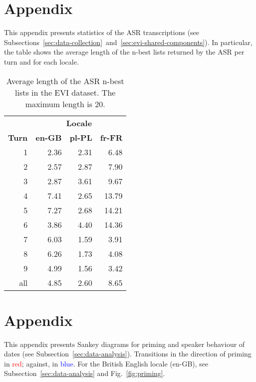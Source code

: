 \documentclass[11pt]{article}
\begin{document}
{\section{Appendix}
\label{appendix-asr}

{
This appendix presents statistics of the ASR transcriptions
(see Subsections~\ref{sec:data-collection}~and~\ref{sec:evi-shared-components}).
In particular, the table shows the average length of the n-best lists
returned by the ASR per turn and for each locale.}


\begin{table}[!h]
\begin{center}
\def\arraystretch{0.95}
{\small
\begin{tabular}{rrrr}
\toprule
& \multicolumn{3}{c}{\textbf{Locale}} \\
\cmidrule{2-4}
\textbf{Turn} & \textbf{en-GB} & \textbf{pl-PL} & \textbf{fr-FR}\\
\midrule
1 
& 2.36 & 2.31 & 6.48\\
2
& 2.57 & 2.87 & 7.90\\
3
& 2.87 & 3.61 & 9.67\\
4
& 7.41 & 2.65 & 13.79\\
5
& 7.27 & 2.68 & 14.21\\
6
& 3.86 & 4.40 & 14.36\\
7
& 6.03 & 1.59 & 3.91\\
8
& 6.26 & 1.73 & 4.08\\
9
& 4.99 & 1.56 & 3.42\\
\midrule
all
& 4.85 & 2.60 & 8.65\\
\bottomrule
\end{tabular}
}\end{center}
\caption{{Average length of the ASR n-best lists in the EVI dataset. The maximum length is 20.}}
\end{table}


\section{Appendix}
\label{appendix-dates}

This appendix
presents Sankey diagrams for priming and speaker behaviour of dates (see Subsection~\ref{sec:data-analysis}). Transitions in the direction of priming in \textcolor{red}{red}; against, in \textcolor{blue}{blue}.
For the British English locale (en-GB), see Subsection~\ref{sec:data-analysis} and Fig.~\ref{fig:priming}.



}
\end{document}
